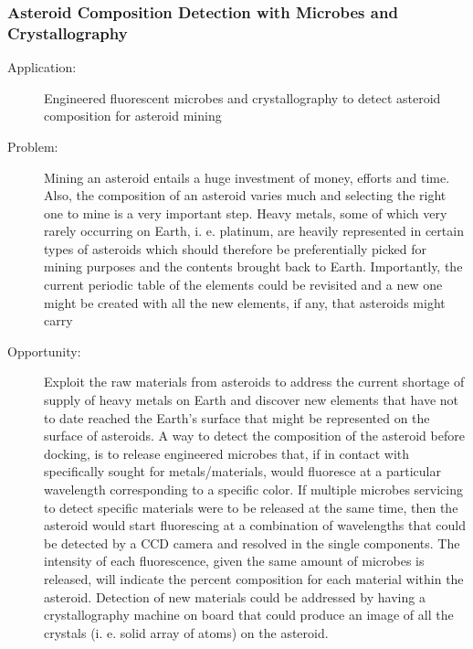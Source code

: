  \subsubsection{Asteroid Composition Detection with Microbes and Crystallography}
\begin{description}
\item[Application:] Engineered fluorescent microbes and \gls{crystallography} to detect asteroid composition for asteroid mining
\item[Problem:] Mining an asteroid entails a huge investment of money, efforts and time. Also, the composition of an asteroid varies much and selecting the right one to mine is a very important step. Heavy metals, some of which very rarely occurring on Earth, i. e. platinum, are heavily represented in certain types of asteroids \cite{Kargel} which should therefore be preferentially picked for mining purposes and the contents brought back to Earth. Importantly, the current periodic table of the elements could be revisited and a new one might be created with all the new elements, if any, that asteroids might carry
\item[Opportunity:] Exploit the raw materials from asteroids to address the current shortage of supply of heavy metals on Earth and discover new elements that have not to date reached the Earth's surface that might be represented on the surface of asteroids. A way to detect the composition of the asteroid before docking, is to release engineered microbes that, if in contact with specifically sought for metals/materials, would fluoresce at a particular wavelength corresponding to a specific color. If multiple microbes servicing to detect specific materials were to be released at the same time, then the asteroid would start fluorescing at a combination of wavelengths that could be detected by a \gls{CCD} camera and resolved in the single components. The intensity of each fluorescence, given the same amount of microbes is released, will indicate the percent composition for each material within the asteroid. Detection of new materials could be addressed by having a \gls{crystallography} machine on board that could produce an image of all the crystals (i. e. solid array of atoms) on the asteroid.


\end{description}
